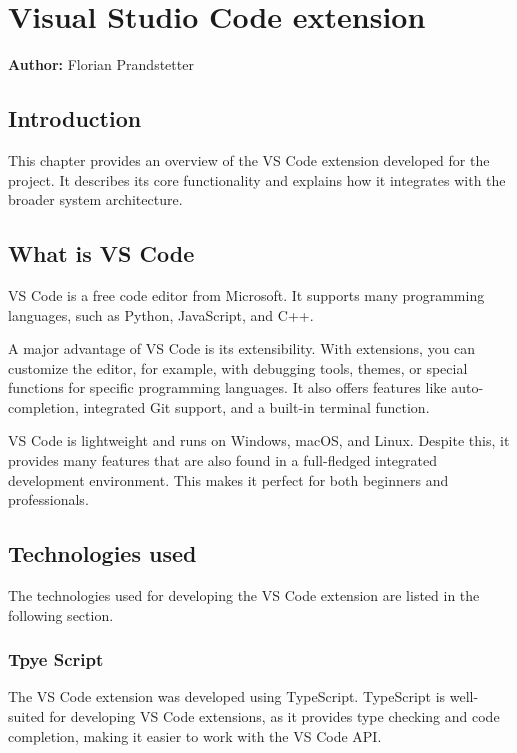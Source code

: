 \chapter{Visual Studio Code extension}
\label{chap:VS_code_extension}
\textbf{Author:} Florian Prandstetter

\section{Introduction}

This chapter provides an overview of the VS Code extension developed for the project. It describes its core functionality and explains how it integrates with the broader system architecture.

\section{What is VS Code}

VS Code is a free code editor from Microsoft. It supports many programming languages, such as Python, JavaScript, and C++.

A major advantage of VS Code is its extensibility. With extensions, you can customize the editor, for example, with debugging tools, themes, or special functions for specific programming languages. It also offers features like auto-completion, integrated Git support, and a built-in terminal function.

VS Code is lightweight and runs on Windows, macOS, and Linux. Despite this, it provides many features that are also found in a full-fledged integrated development environment. This makes it perfect for both beginners and professionals.

\section{Technologies used}

The technologies used for developing the VS Code extension are listed in the following section.

\subsection{Tpye Script}

The VS Code extension was developed using TypeScript. TypeScript is well-suited for developing VS Code extensions, as it provides type checking and code completion, making it easier to work with the VS Code API.

